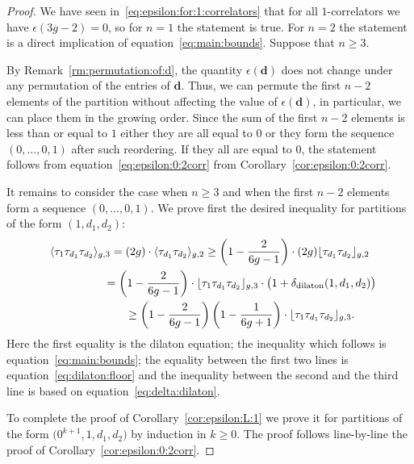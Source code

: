 \begin{proof}We have seen in~\eqref{eq:epsilon:for:1:correlators}
that for all $1$-correlators we have
$\epsilon(3g-2)=0$,
so for $n=1$ the statement is true.
For $n=2$ the statement is a direct implication
of equation~\eqref{eq:main:bounds}.
Suppose that $n\ge 3$.

By Remark~\ref{rm:permutation:of:d}, the quantity
$\epsilon(\boldsymbol{d})$ does not change under any permutation of the entries of $\boldsymbol{d}$. Thus, we can permute the first $n-2$ elements of the partition without affecting the value of $\epsilon(\boldsymbol{d})$, in particular, we can place them in the growing order. Since the sum of the first $n-2$
elements is less than or equal to $1$ either they are all
equal to $0$ or they form the sequence $(0,\dots,0,1)$
after such reordering. If they all are equal to $0$, the
statement follows from equation~\eqref{eq:epsilon:0:2corr}
from Corollary~\eqref{cor:epsilon:0:2corr}.

It remains to consider the case when $n\ge 3$ and when the first $n-2$ elements form a sequence $(0,\dots,0,1)$. We prove first the desired inequality for partitions of the form $(1,d_1,d_2)$:
\begin{gather*}
\langle \tau_1\tau_{d_1}\tau_{d_2}\rangle_{g,3}
=(2g)\cdot\langle \tau_{d_1} \tau_{d_2}\rangle_{g,2}
\ge\left(1-\frac{2}{6g-1}\right)\cdot
(2g)\lfloor \tau_{d_1}\tau_{d_2}\rfloor_{g,2}
\\
\hphantom{\langle \tau_1\tau_{d_1}\tau_{d_2}\rangle_{g,3}}{}
=\left(1-\frac{2}{6g-1}\right)\cdot
\lfloor \tau_1\tau_{d_1}\tau_{d_2}\rfloor_{g,3}
\cdot\big(1+\delta_{\rm dilaton}(1,d_1,d_2)\big)
\\
\hphantom{\langle \tau_1\tau_{d_1}\tau_{d_2}\rangle_{g,3}}{}
\ge\left(1-\frac{2}{6g-1}\right)\left(1-\frac{1}{6g+1}\right)
\cdot\lfloor \tau_1\tau_{d_1}\tau_{d_2}\rfloor_{g,3} .
\end{gather*}
Here the first equality is the dilaton equation;
the inequality which follows is
equation~\eqref{eq:main:bounds}; the equality
between the first two lines is equation~\eqref{eq:dilaton:floor}
and the inequality between the second and the third line
is based on equation~\eqref{eq:delta:dilaton}.

To complete the proof of Corollary~\ref{cor:epsilon:L:1} we prove it for partitions of the form
$\big(0^{k+1},1,d_1,d_2\big)$ by induction in $k\ge 0$. The proof follows line-by-line the proof of Corollary~\ref{cor:epsilon:0:2corr}.
\end{proof}

